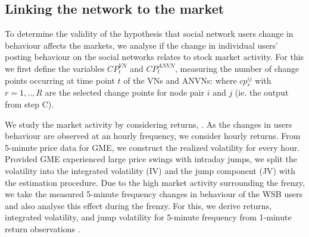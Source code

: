 \subsection{Linking the network to the market} \label{sec:model_fin}
To determine the validity of the hypothesis that social network users change in behaviour affects the markets, we analyse if the change in individual users' posting behaviour on the social networks relates to stock market activity. For this we first define the variables $CP_t^{VN}$ and $CP_t^{ANVN}$, measuring the number of change points occurring at time point $t$ of the VNs and ANVNs:
where $cp^{ij}_r$ with $r=1,..,R$ are the selected change points for node pair $i$ and $j$ (ie. the output from step C). 

We study the market activity by considering returns, . As the changes in users behaviour are observed at an hourly frequency, we consider hourly returns. From 5-minute price data for GME, we construct the realized volatility for every hour. Provided GME experienced large price swings with intraday jumps, we split the volatility into the integrated volatility (IV) and the jump component (JV) with the \textcite{Andersen2007} estimation procedure.  
Due to the high market activity surrounding the frenzy, we take the measured 5-minute frequency changes in behaviour of the WSB users and also analyse this effect during the frenzy. For this, we derive returns, integrated volatility, and jump volatility for 5-minute frequency from 1-minute return observations . 


